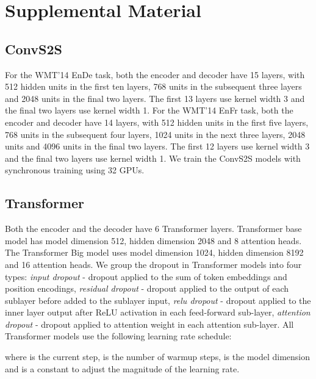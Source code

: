 \documentclass[11pt,a4paper]{article}
\begin{document}



\vfill

\pagebreak

\appendix

\section{Supplemental Material}
\label{sec:supplemental}

\subsection{ConvS2S}

For the WMT'14 EnDe task, both the encoder and decoder have 15
layers, with 512 hidden units in the first ten layers, 768 units in the
subsequent three layers and 2048 units in the final two layers.
The first 13 layers use kernel width 3 and the final two layers use kernel
width 1. For the WMT'14 EnFr task, both the encoder and decoder
have 14 layers, with 512 hidden units in the first five layers, 768 units
in the subsequent four layers, 1024 units in the next three layers, 2048 units
and 4096 units in the final two layers. The first 12 layers use kernel width 3
and the final two layers use kernel width 1.
We train the ConvS2S models with synchronous training using 32 GPUs.

\subsection{Transformer}

Both the encoder and the decoder have 6 Transformer layers. Transformer base
model has model dimension 512, hidden dimension 2048 and 8 attention heads.
The Transformer Big model uses model dimension 1024, hidden dimension
8192 and 16
attention heads. We group the dropout in Transformer models into four types:
\textit{input dropout} - dropout applied to the sum of token embeddings and
position encodings, \textit{residual dropout} - dropout applied to the output
of each sublayer before added to the sublayer input, \textit{relu dropout} -
dropout applied to the inner layer output after ReLU activation in each
feed-forward sub-layer, \textit{attention dropout} - dropout applied to
attention weight in each attention sub-layer. All Transformer models
use the following learning rate schedule:

where  is the current step,  is the number of warmup steps, 
is the model dimension and  is a constant to adjust the magnitude of the
learning rate.
\end{document}
